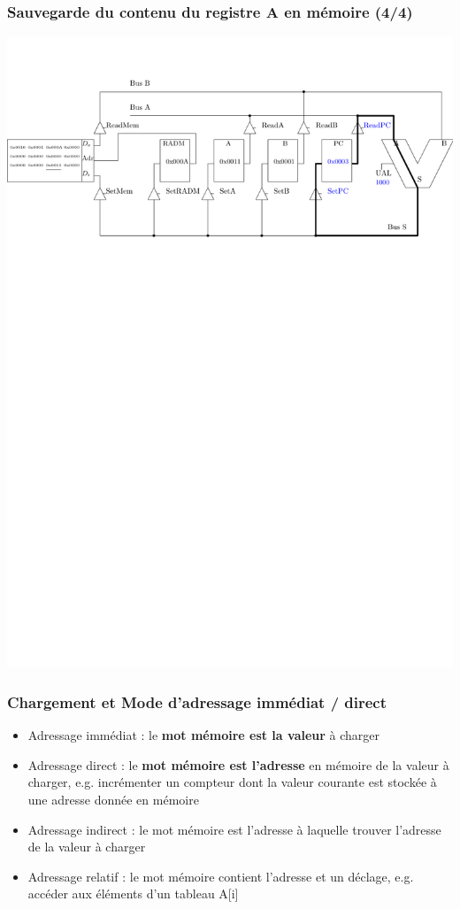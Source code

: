 \documentclass{beamer}
\begin{document}
\begin{frame}
\frametitle{Sauvegarde du contenu du registre A en mémoire (4/4)}
\includegraphics[width=\linewidth]{Figs/premier_chemin_sta4.pdf}
\end{frame}


\begin{frame}
\frametitle{Chargement et Mode d'adressage immédiat / direct}
\begin{itemize}
\item Adressage immédiat : le \textbf{mot mémoire est la valeur} à charger
\item Adressage direct : le \textbf{mot mémoire est l'adresse} en mémoire de la valeur à charger, e.g. incrémenter un compteur dont la valeur courante est stockée à une adresse donnée en mémoire
\item Adressage indirect : le mot mémoire est l'adresse à laquelle trouver l'adresse de la valeur à charger
\item Adressage relatif : le mot mémoire contient l'adresse et un déclage, e.g. accéder aux éléments d'un tableau A[i]
\end{itemize}
\end{frame}
\end{document}
